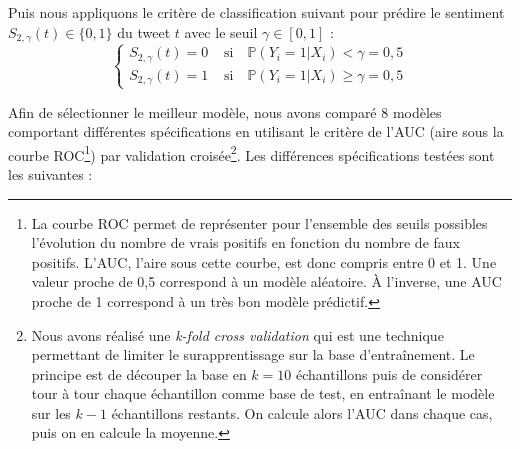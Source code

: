 \documentclass[11pt,french,french]{article}
\let\rmarkdownfootnote\footnote%
\def\footnote{\protect\rmarkdownfootnote}
\begin{document}
Puis nous appliquons le critère de classification suivant pour prédire le sentiment \(S_{2,\gamma}(t) \in \{0,1\}\) du tweet \(t\) avec le seuil \(\gamma \in [0,1]\) :
\[
\begin{cases}
S_{2,\gamma}(t) = 0 &  \text{ si} \quad \mathbb{P}(Y_i = 1 | X_{i}) < \gamma = 0,5 \\
S_{2,\gamma}(t) = 1 &  \text{ si} \quad \mathbb{P}(Y_i = 1 | X_{i}) \ge \gamma = 0,5
\end{cases}
\]

Afin de sélectionner le meilleur modèle, nous avons comparé 8 modèles comportant différentes spécifications en utilisant le critère de l'AUC (aire sous la courbe ROC\footnote{La courbe ROC permet de représenter pour l'ensemble des seuils possibles l'évolution du nombre de vrais positifs en fonction du nombre de faux positifs.
  L'AUC, l'aire sous cette courbe, est donc compris entre 0 et 1. Une valeur proche de 0,5 correspond à un modèle aléatoire. À l'inverse, une AUC proche de 1 correspond à un très bon modèle prédictif.}) par validation croisée\footnote{Nous avons réalisé une \emph{k-fold cross validation} qui est une technique permettant de limiter le surapprentissage sur la base d'entraînement. Le principe est de découper la base en \(k = 10\) échantillons puis de considérer tour à tour chaque échantillon comme base de test, en entraînant le modèle sur les \(k-1\) échantillons restants. On calcule alors l'AUC dans chaque cas, puis on en calcule la moyenne. }. Les différences spécifications testées sont les suivantes :
\end{document}
